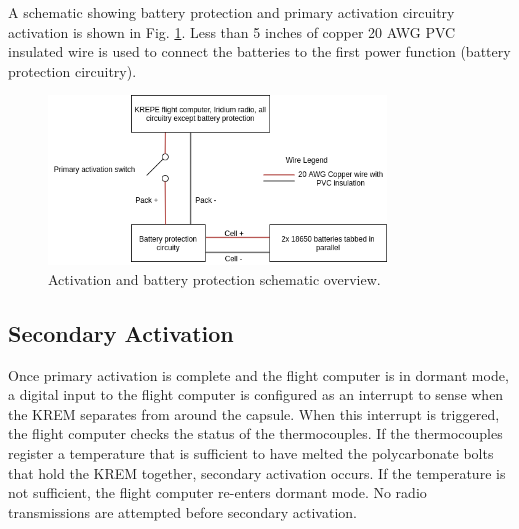 \documentclass{article}
\begin{document}
A schematic showing battery protection and primary activation circuitry activation is shown in Fig. \ref{fig:activation-circuitry}. Less than 5 inches of copper 20 AWG PVC insulated wire is used to connect the batteries to the first power function (battery protection circuitry).




\begin{figure}[H]
    \centering
    \includegraphics[width=0.8\textwidth]{images/krepe-electrical-overview.png}
    \caption{Activation and battery protection schematic overview.}
    \label{fig:activation-circuitry}
\end{figure}







\subsection{Secondary Activation}
\label{sec:secondary-activation}
Once primary activation is complete and the flight computer is in dormant mode, a digital input to the flight computer is configured as an interrupt to sense when the KREM separates from around the capsule. When this interrupt is triggered, the flight computer checks the status of the thermocouples. If the thermocouples register a temperature that is sufficient to have melted the polycarbonate bolts that hold the KREM together, secondary activation occurs. If the temperature is not sufficient, the flight computer re-enters dormant mode. No radio transmissions are attempted before secondary activation. 
\end{document}
